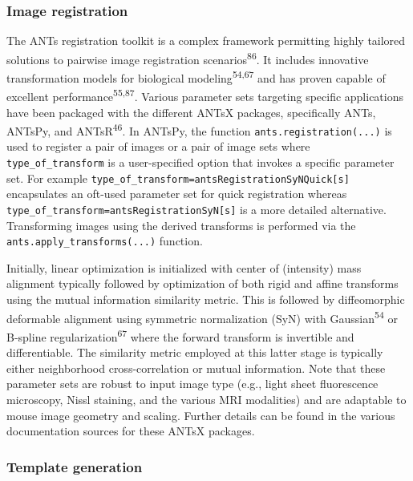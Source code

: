 \documentclass[
  12pt,
]{article}
\begin{document}
\subsubsection{Image registration}\label{image-registration}

The ANTs registration toolkit is a complex framework permitting highly
tailored solutions to pairwise image registration
scenarios\textsuperscript{86}. It includes innovative transformation
models for biological modeling\textsuperscript{54,67} and has proven
capable of excellent performance\textsuperscript{55,87}. Various
parameter sets targeting specific applications have been packaged with
the different ANTsX packages, specifically ANTs, ANTsPy, and
ANTsR\textsuperscript{46}. In ANTsPy, the function
\texttt{ants.registration(...)} is used to register a pair of images or
a pair of image sets where \texttt{type\_of\_transform} is a
user-specified option that invokes a specific parameter set. For example
\texttt{type\_of\_transform=\textquotesingle{}antsRegistrationSyNQuick{[}s{]}\textquotesingle{}}
encapsulates an oft-used parameter set for quick registration whereas
\texttt{type\_of\_transform=\textquotesingle{}antsRegistrationSyN{[}s{]}\textquotesingle{}}
is a more detailed alternative. Transforming images using the derived
transforms is performed via the \texttt{ants.apply\_transforms(...)}
function.

Initially, linear optimization is initialized with center of (intensity)
mass alignment typically followed by optimization of both rigid and
affine transforms using the mutual information similarity metric. This
is followed by diffeomorphic deformable alignment using symmetric
normalization (SyN) with Gaussian\textsuperscript{54} or B-spline
regularization\textsuperscript{67} where the forward transform is
invertible and differentiable. The similarity metric employed at this
latter stage is typically either neighborhood cross-correlation or
mutual information. Note that these parameter sets are robust to input
image type (e.g., light sheet fluorescence microscopy, Nissl staining,
and the various MRI modalities) and are adaptable to mouse image
geometry and scaling. Further details can be found in the various
documentation sources for these ANTsX packages.

\subsubsection{Template generation}\label{template-generation}
\end{document}
